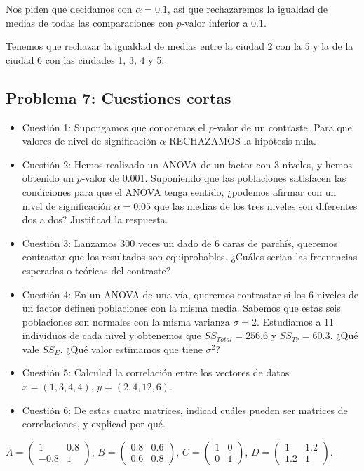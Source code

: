 \documentclass[
]{article}
\providecommand{\tightlist}{%
  \setlength{\itemsep}{0pt}\setlength{\parskip}{0pt}}
\begin{document}
Nos piden que decidamos con \(\alpha=0.1\), así que rechazaremos la
igualdad de medias de todas las comparaciones con \(p\)-valor inferior a
\(0.1\).

Tenemos que rechazar la igualdad de medias entre la ciudad 2 con la 5 y
la de la ciudad 6 con las ciudades 1, 3, 4 y 5.

\hypertarget{problema-7-cuestiones-cortas}{%
\subsection{Problema 7: Cuestiones
cortas}\label{problema-7-cuestiones-cortas}}

\begin{itemize}
\tightlist
\item
  Cuestión 1: Supongamos que conocemos el \(p\)-valor de un contraste.
  Para que valores de nivel de significación \(\alpha\) RECHAZAMOS la
  hipótesis nula.
\item
  Cuestión 2: Hemos realizado un ANOVA de un factor con 3 niveles, y
  hemos obtenido un \(p\)-valor de 0.001. Suponiendo que las poblaciones
  satisfacen las condiciones para que el ANOVA tenga sentido, ¿podemos
  afirmar con un nivel de significación \(\alpha= 0.05\) que las medias
  de los tres niveles son diferentes dos a dos? Justificad la respuesta.
\item
  Cuestión 3: Lanzamos 300 veces un dado de 6 caras de parchís, queremos
  contrastar que los resultados son equiprobables. ¿Cuáles serian las
  frecuencias esperadas o teóricas del contraste?
\item
  Cuestión 4: En un ANOVA de una vía, queremos contrastar si los 6
  niveles de un factor definen poblaciones con la misma media. Sabemos
  que estas seis poblaciones son normales con la misma varianza
  \(\sigma=2\). Estudiamos a 11 individuos de cada nivel y obtenemos que
  \(SS_{Total}=256.6\) y \(SS_{Tr}=60.3\). ¿Qué vale \(SS_E\). ¿Qué
  valor estimamos que tiene \(\sigma^2\)?
\item
  Cuestión 5: Calculad la correlación entre los vectores de datos
  \(x=(1,3,4,4)\), \(y=(2,4,12,6)\).
\item
  Cuestión 6: De estas cuatro matrices, indicad cuáles pueden ser
  matrices de correlaciones, y explicad por qué.
\end{itemize}

\(A=\left(\begin{array}{cc} 1 & 0.8\\-0.8 & 1\end{array}\right)\),
\(B=\left(\begin{array}{cc} 0.8 & 0.6\\0.6 & 0.8\end{array}\right)\),
\(C=\left(\begin{array}{cc} 1 & 0\\0 & 1\end{array}\right)\),
\(D=\left(\begin{array}{cc} 1 & 1.2\\1.2 & 1\end{array}\right)\).
\end{document}

